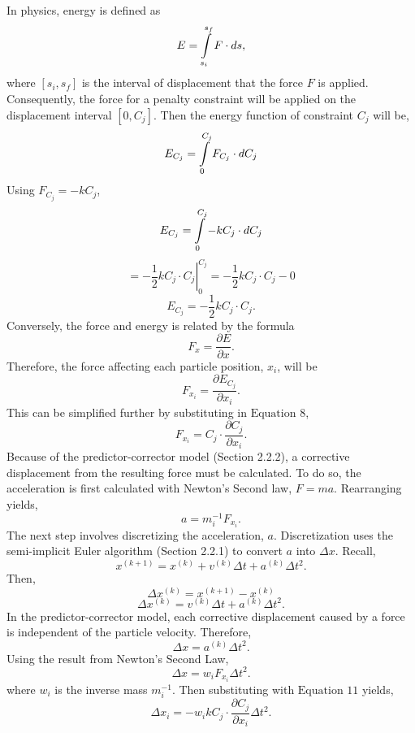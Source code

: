 \documentclass[12pt, letterpaper]{article}
\begin{document}
In physics, energy is defined as 
$$E= \intop_{s_i}^{s_f}  F\cdot ds,$$
where $[s_i, s_f]$ is the interval of displacement that the force $F$ is applied. Consequently, the force for a penalty constraint will be applied on the displacement interval $[0, C_j]$. Then the energy function of constraint $C_j$ will be, 
$$E_{C_j}=\intop_{0}^{C_j}  F_{C_j}\cdot dC_j$$
Using $F_{C_j} = -kC_j$,
$$E_{C_j} = \intop_{0}^{C_j} -kC_j \cdot dC_j$$
$$= \left. -\frac{1}{2}kC_j\cdot C_j \right|_{0}^{C_j} =  -\frac{1}{2}kC_j\cdot C_j -0$$
\begin{equation}
   E_{C_j}= -\frac{1}{2}kC_j\cdot C_j.
\end{equation}
Conversely, the force and energy is related by the formula
\begin{equation}
   F_{x} = \frac{\partial E}{\partial x}.
\end{equation}
Therefore, the force affecting each particle position, $x_i$, will be
\begin{equation}
   F_{x_{i}} = \frac{\partial E_{C_{j}}}{\partial x_{i}}.
\end{equation}
This can be simplified further by substituting in $\text{Equation 8}$,
\begin{equation}
    F_{x_{i}} = C_j\cdot \frac{\partial C_j}{\partial x_{i}}.
\end{equation}
Because of the predictor-corrector model (Section 2.2.2), a corrective displacement from the resulting force must be calculated. To do so, the acceleration is first calculated with Newton’s Second law, $F = ma$. Rearranging yields, $$a = m_i^{-1}F_{x_i}.$$ 
The next step involves discretizing the acceleration, $a$. Discretization uses the semi-implicit Euler algorithm (Section 2.2.1) to convert $a$ into $\Delta x$. Recall, 
$$x^{(k+1)} = x^{(k)} + v^{(k)}\Delta t + a^{(k)}\Delta t^{2}.$$
Then,
$$\Delta x^{(k)} = x^{(k+1)} - x^{(k)}$$
$$\Delta x^{(k)} = v^{(k)}\Delta t + a^{(k)}\Delta t^{2}.$$
In the predictor-corrector model, each corrective displacement caused by a force is independent of the particle velocity. Therefore,
$$\Delta x = a^{(k)}\Delta t^{2}.$$
Using the result from Newton's Second Law, 
\begin{equation}
   \Delta x = w_i F_{x_i}\Delta t^{2}.
\end{equation}
where $w_i$ is the inverse mass $m_i^{-1}$. Then substituting with $\text{Equation 11}$ yields,
\begin{equation}
    \Delta x_{i} = -w_{i}kC_j\cdot \frac{\partial C_j}{\partial x_{i}} \Delta t^{2}.
\end{equation}
\end{document}
